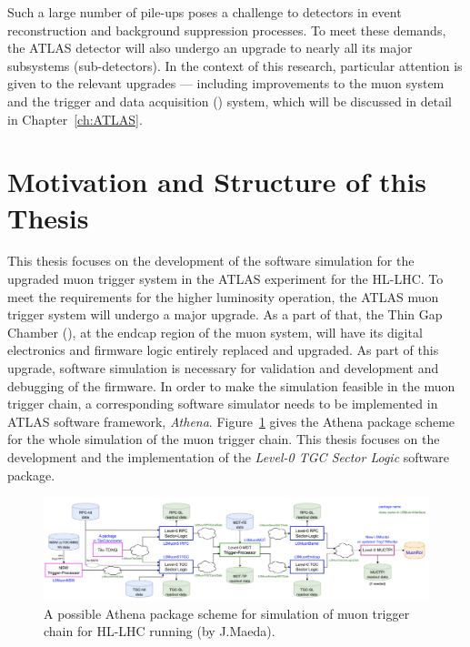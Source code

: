 Such a large number of pile-ups poses a challenge to detectors in event reconstruction and background suppression processes. To meet these demands, the ATLAS detector will also undergo an upgrade to nearly all its major subsystems (sub-detectors). In the context of this research, particular attention is given to the relevant upgrades — including improvements to the muon system and the trigger and data acquisition (\TDAQ) system, which will be discussed in detail in Chapter~\ref{ch:ATLAS}.

\section{Motivation and Structure of this Thesis} \label{sec:motivation}
This thesis focuses on the development of the software simulation for the upgraded muon trigger system in the ATLAS experiment for the HL-LHC. To meet the requirements for the higher luminosity operation, the ATLAS muon trigger system will undergo a major upgrade. As a part of that, the Thin Gap Chamber (\TGC), at the endcap region of the muon system, will have its digital electronics and firmware logic entirely replaced and upgraded. As part of this upgrade, software simulation is necessary for validation and development and debugging of the firmware. In order to make the simulation feasible in the muon trigger chain, a corresponding software simulator needs to be implemented in ATLAS software framework, \textit{Athena}. Figure~\ref{fig:L0_trigger_chain} gives the Athena package scheme for the whole simulation of the muon trigger chain. This thesis focuses on the development and the implementation of the \textit{Level-0 TGC Sector Logic} software package.

\begin{figure}[htbp]
  \centering
  \includegraphics[width=1.0\textwidth]{figs/chapter1/L0_trigger_chain.png}
  \caption{A possible Athena package scheme for simulation of muon trigger chain for HL-LHC running (by J.Maeda).}
  \label{fig:L0_trigger_chain}
\end{figure}

